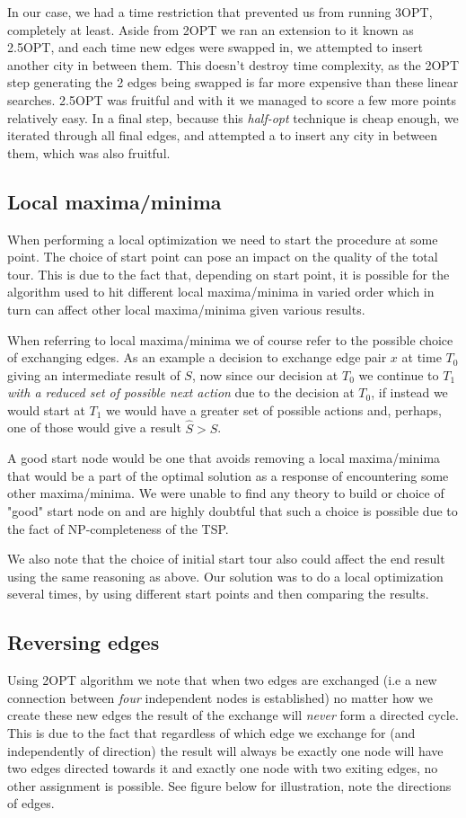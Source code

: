 \documentclass[a4paper,12pt,oneside]{article}
\begin{document}
In our case, we had a time restriction that prevented us from running 3OPT, completely at least. Aside from 2OPT we ran an extension to it known as 2.5OPT, and each time new edges were swapped in, we attempted to insert another city in between them. This doesn't destroy time complexity, as the 2OPT step generating the 2 edges being swapped is far more expensive than these linear searches. 2.5OPT was fruitful and with it we managed to score a few more points relatively easy. In a final step, because this \emph{half-opt} technique is cheap enough, we iterated through all final edges, and attempted a to insert any city in between them, which was also fruitful.

\subsection{Local maxima/minima}
When performing a local optimization we need to start the procedure at some point. The choice of start point can pose an impact on the quality of the total tour. This is due to the fact that, depending on start point, it is possible for the algorithm used to hit different local maxima/minima in varied order which in turn can affect other local maxima/minima given various results.

When referring to local maxima/minima we of course refer to the possible choice of exchanging edges. As an example a decision to exchange edge pair $x$ at time $T_0$ giving an intermediate result of $S$, now since our decision at $T_0$ we continue to $T_1$ \textit{with a reduced set of possible next action} due to the decision at $T_0$, if instead we would start at $T_1$ we would have a greater set of possible actions and, perhaps, one of those would give a result $\hat{S} > S$.

A good start node would be one that avoids removing a local maxima/minima that would be a part of the optimal solution as a response of encountering some other maxima/minima. We were unable to find any theory to build or choice of "good" start node on and are highly doubtful that such a choice is possible due to the fact of NP-completeness of the TSP.

We also note that the choice of initial start tour also could affect the end result using the same reasoning as above. Our solution was to do a local optimization several times, by using different start points and then comparing the results.

\subsection{Reversing edges}
Using 2OPT algorithm we note that when two edges are exchanged (i.e a new connection between \textit{four} independent nodes is established) no matter how we create these new edges the result of the exchange will \textit{never} form a directed cycle. This is due to the fact that regardless of which edge we exchange for (and independently of direction) the result will always be exactly one node will have two edges directed towards it and exactly one node with two exiting edges, no other assignment is possible. See figure below for illustration, note the directions of edges.
\end{document}
